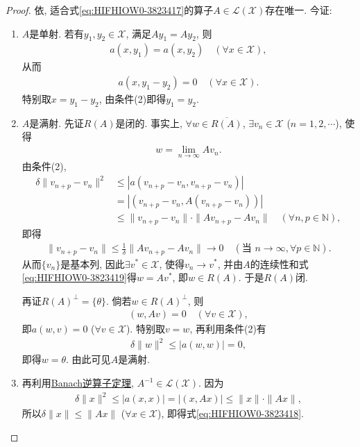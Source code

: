 \documentclass[../../main.tex]{subfiles}%
\begin{document}
\begin{proof}

依, 适合式\eqref{eq:HIFHIOW0-3823417}的算子$A\in\mathscr{L}(\mathscr{X})$存在唯一. 今证:
\begin{enumerate}[(1)]
\item $A$是单射. 若有$y_1,y_2\in\mathscr{X}$, 满足$Ay_1=Ay_2$, 则
\begin{align*}
a(x,y_1) = a(x,y_2) \quad (\forall x\in\mathscr{X}),
\end{align*}
从而
\begin{align*}
a(x,y_1 - y_2) = 0 \quad (\forall x\in\mathscr{X}).
\end{align*}
特别取$x=y_1 - y_2$, 由条件(2)即得$y_1=y_2$.
\item $A$是满射. 先证$R(A)$是闭的. 事实上, $\forall w\in\overline{R(A)}$, $\exists v_n\in\mathscr{X}$ ($n=1,2,\cdots$), 使得
\begin{align}
w = \lim_{n\to\infty}Av_n.
\label{eq:HIFHIOW0-3823419}
\end{align}
由条件(2),
\begin{align*}
\delta\|v_{n+p} - v_n\|^2 &\leqslant |a(v_{n+p} - v_n, v_{n+p} - v_n)| \\
&= |(v_{n+p} - v_n, A(v_{n+p} - v_n))| \\
&\leqslant \|v_{n+p} - v_n\| \cdot \|Av_{n+p} - Av_n\| \quad (\forall n,p\in\mathbb{N}),
\end{align*}
即得
\begin{align*}
\|v_{n+p} - v_n\| \leqslant \frac{1}{\delta}\|Av_{n+p} - Av_n\| \to 0 \quad (\text{当 }n\to\infty, \forall p\in\mathbb{N}).
\end{align*}
从而$\{v_n\}$是基本列, 因此$\exists v^*\in\mathscr{X}$, 使得$v_n\to v^*$, 并由$A$的连续性和式\eqref{eq:HIFHIOW0-3823419}得$w=Av^*$, 即$w\in R(A)$. 于是$R(A)$闭.

再证$R(A)^\perp=\{\theta\}$. 倘若$w\in R(A)^\perp$, 则
\begin{align*}
(w,Av) = 0 \quad (\forall v\in\mathscr{X}),
\end{align*}
即$a(w,v)=0$ ($\forall v\in\mathscr{X}$). 特别取$v=w$, 再利用条件(2)有
\begin{align*}
\delta\|w\|^2 \leqslant |a(w,w)| = 0,
\end{align*}
即得$w=\theta$. 由此可见$A$是满射.
\item 再利用\hyperref[theorem:泛函分析--Banach逆算子定理]{Banach逆算子定理}, $A^{-1}\in\mathscr{L}(\mathscr{X})$. 因为
\begin{align*}
\delta\|x\|^2 \leqslant |a(x,x)| = |(x,Ax)| \leqslant \|x\| \cdot \|Ax\|,
\end{align*}
所以$\delta\|x\| \leqslant \|Ax\|$ ($\forall x\in\mathscr{X}$), 即得式\eqref{eq:HIFHIOW0-3823418}.
\end{enumerate}

\end{proof}
\end{document}

